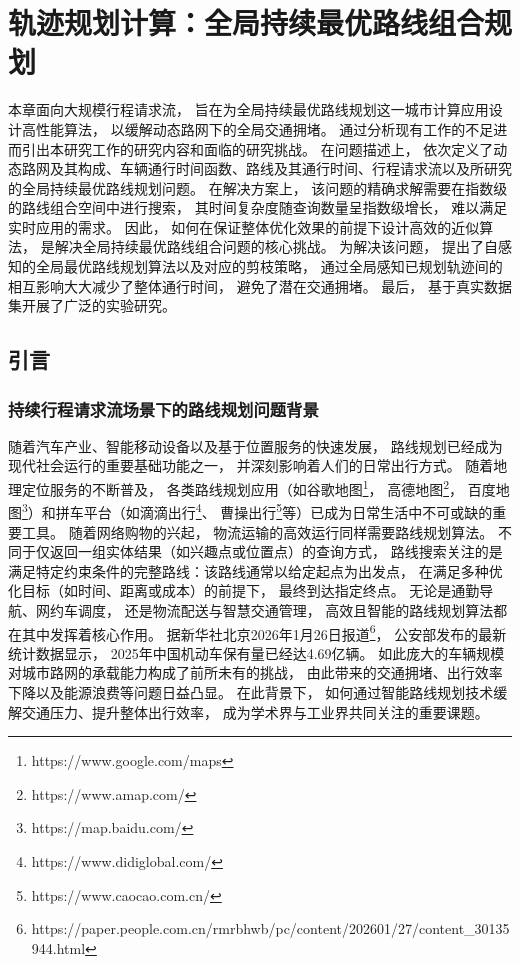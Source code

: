 \chapter{轨迹规划计算：全局持续最优路线组合规划}
\label{cha:route search}
本章面向大规模行程请求流， 旨在为全局持续最优路线规划这一城市计算应用设计高性能算法， 以缓解动态路网下的全局交通拥堵。 通过分析现有工作的不足进而引出本研究工作的研究内容和面临的研究挑战。 在问题描述上， 依次定义了动态路网及其构成、车辆通行时间函数、路线及其通行时间、行程请求流以及所研究的全局持续最优路线规划问题。 在解决方案上， 该问题的精确求解需要在指数级的路线组合空间中进行搜索， 其时间复杂度随查询数量呈指数级增长， 难以满足实时应用的需求。 因此， 如何在保证整体优化效果的前提下设计高效的近似算法， 是解决全局持续最优路线组合问题的核心挑战。 为解决该问题， 提出了自感知的全局最优路线规划算法以及对应的剪枝策略， 通过全局感知已规划轨迹间的相互影响大大减少了整体通行时间， 避免了潜在交通拥堵。 最后， 基于真实数据集开展了广泛的实验研究。
\section{引言}
\subsection{持续行程请求流场景下的路线规划问题背景}
随着汽车产业、智能移动设备以及基于位置服务的快速发展， 路线规划已经成为现代社会运行的重要基础功能之一， 并深刻影响着人们的日常出行方式。 随着地理定位服务的不断普及， 各类路线规划应用（如谷歌地图\footnote{https://www.google.com/maps}， 高德地图\footnote{https://www.amap.com/}， 百度地图\footnote{https://map.baidu.com/}）和拼车平台（如滴滴出行\footnote{https://www.didiglobal.com/}、 曹操出行\footnote{https://www.caocao.com.cn/}等）已成为日常生活中不可或缺的重要工具。 随着网络购物的兴起， 物流运输的高效运行同样需要路线规划算法。 不同于仅返回一组实体结果（如兴趣点或位置点）的查询方式， 路线搜索关注的是满足特定约束条件的完整路线：该路线通常以给定起点为出发点， 在满足多种优化目标（如时间、距离或成本）的前提下， 最终到达指定终点。 无论是通勤导航、网约车调度， 还是物流配送与智慧交通管理， 高效且智能的路线规划算法都在其中发挥着核心作用。 据新华社北京2026年1月26日报道\footnote{https://paper.people.com.cn/rmrbhwb/pc/content/202601/27/content\_30135944.html }， 公安部发布的最新统计数据显示， 2025年中国机动车保有量已经达4.69亿辆。 如此庞大的车辆规模对城市路网的承载能力构成了前所未有的挑战， 由此带来的交通拥堵、出行效率下降以及能源浪费等问题日益凸显。 在此背景下， 如何通过智能路线规划技术缓解交通压力、提升整体出行效率， 成为学术界与工业界共同关注的重要课题。

